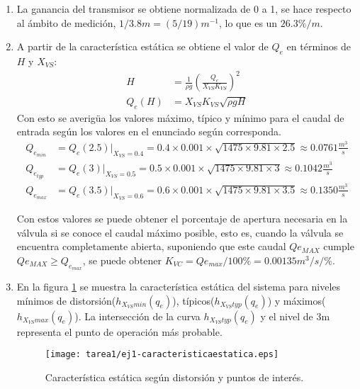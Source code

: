 \begin{ejercicio}

  \begin{enumerate}
    \item
    La ganancia del transmisor se obtiene normalizada de 0 a 1, se hace respecto al ámbito de medición, $1/3.8m = (5/19)m^{-1}$, lo que es un $26.3\%/m$.

    \item 
    A partir de la característica estática se obtiene el valor de $Q_e$ en términos de $H$ y $X_{VS}$:
    \begin{align*}
    H &=\frac{1}{\rho g} \left( \frac{Q_e}{X_{VS}K_{VS}} \right)^2
    \\
    Q_e(H) &= X_{VS} K_{VS}\sqrt{\rho g H}
    \end{align*}
    Con esto se averigüa los valores máximo, típico y mínimo para el caudal de entrada según los valores en el enunciado según corresponda.
    \begin{align*}
    Q_{e_{min}} &= Q_{e}(2.5)|_{X_{VS}=0.4} = 0.4 \times 0.001 \times \sqrt{1475\times9.81\times2.5} \approx 0.0761 \frac{m^3}{s}
    \\
    Q_{e_{typ}} &= Q_{e}(3)|_{X_{VS}=0.5} = 0.5 \times 0.001 \times \sqrt{1475\times9.81\times3} \approx 0.1042 \frac{m^3}{s}
    \\
    Q_{e_{max}} &= Q_{e}(3.5)|_{X_{VS}=0.6} = 0.6 \times 0.001 \times \sqrt{1475\times9.81\times3.5} \approx 0.1350 \frac{m^3}{s}
    \end{align*}

    Con estos valores se puede obtener el porcentaje de apertura necesaria en la válvula si se conoce el caudal máximo posible, esto es, cuando la válvula se encuentra completamente abierta, suponiendo que este caudal $Q{e_{MAX}}$ cumple $Q{e_{MAX}} \geq Q_{e_{max}}$, se puede obtener $K_{VC}=Q{e_{max}}/100\%=0.00135m^3/s/\%$.

    \item En la figura \ref{ej1:img1} se muestra la característica estática del sistema para niveles mínimos de distorsión($h_{X_{VS}min}(q_e)$), típicos($h_{X_{VS}typ}(q_e)$) y máximos($h_{X_{VS}max}(q_e)$). La intersección de la curva $h_{X_{VS}typ}(q_e)$ y el nivel de 3m representa el punto de operación más probable.
    \begin{figure}[H]
      \centering
      \texttt{[image: tarea1/ej1-caracteristicaestatica.eps]}
      \caption{Característica estática según distorsión y puntos de interés.}
      \label{ej1:img1}
    \end{figure}

  \end{enumerate}

\end{ejercicio}